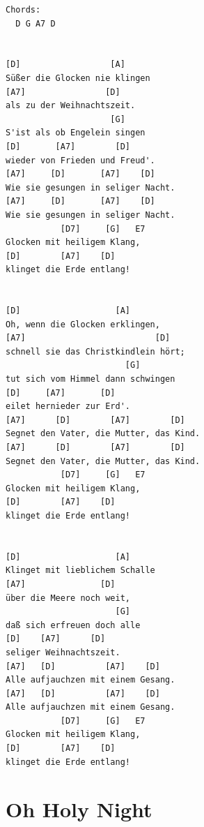\documentclass[
]{book}
\let\stdsection\section
\renewcommand\section{\clearpage\stdsection}
\begin{document}
\begin{verbatim}
Chords:
  D G A7 D 


[D]                  [A]
Süßer die Glocken nie klingen
[A7]                [D]
als zu der Weihnachtszeit.
                     [G]
S'ist als ob Engelein singen
[D]       [A7]        [D]
wieder von Frieden und Freud'.
[A7]     [D]       [A7]    [D]
Wie sie gesungen in seliger Nacht.
[A7]     [D]       [A7]    [D]
Wie sie gesungen in seliger Nacht.
           [D7]     [G]   E7
Glocken mit heiligem Klang,
[D]        [A7]    [D]
klinget die Erde entlang!

 
[D]                   [A]
Oh, wenn die Glocken erklingen,
[A7]                          [D]
schnell sie das Christkindlein hört;
                        [G]
tut sich vom Himmel dann schwingen
[D]     [A7]       [D]
eilet hernieder zur Erd'.
[A7]      [D]        [A7]        [D]
Segnet den Vater, die Mutter, das Kind.
[A7]      [D]        [A7]        [D]
Segnet den Vater, die Mutter, das Kind.
           [D7]     [G]   E7
Glocken mit heiligem Klang,
[D]        [A7]    [D]
klinget die Erde entlang!


[D]                   [A]
Klinget mit lieblichem Schalle
[A7]               [D]
über die Meere noch weit,
                      [G]
daß sich erfreuen doch alle
[D]    [A7]      [D]
seliger Weihnachtszeit.
[A7]   [D]          [A7]    [D]
Alle aufjauchzen mit einem Gesang.
[A7]   [D]          [A7]    [D]
Alle aufjauchzen mit einem Gesang.
           [D7]     [G]   E7
Glocken mit heiligem Klang,
[D]        [A7]    [D]
klinget die Erde entlang!
\end{verbatim}

\hypertarget{weihnachten-oh-holy-night}{%
\section{Oh Holy Night}\label{weihnachten-oh-holy-night}}
\end{document}
